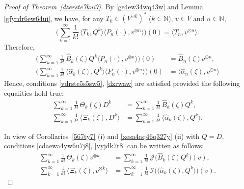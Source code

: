 \documentclass[12pt]{article}
\theoremstyle{remark}
\theoremstyle{remark}
\theoremstyle{remark}
\begin{document}
\begin{proof}[Proof of Theorem~\ref{dzerste7kui7}]
By \eqref{ge4ew34wq43w} and Lemma \ref{gfyrdr6ew64ui}, we have, for any $T_k\in(V^{\odot k})^*$ ($k\in\mathbb N$), $v\in V$ and $n\in\mathbb N$,
\begin{equation*}
\bigg(\sum_{k=1}^\infty \frac 1{k!}\,\langle T_k, Q^{k}\rangle\langle P_n(\cdot),v^{\otimes n}\rangle\bigg)(0)=\langle T_n,v^{\odot n}\rangle.
\end{equation*}
Therefore,
\begin{align*}
\bigg(\sum_{k=1}^\infty \frac 1{k!}\,\widehat B_{k}(\zeta)Q^{k}\langle P_n(\cdot),v^{\otimes n}\rangle\bigg)(0)&=\widehat B_{n}(\zeta)v^{\odot n},\\
\bigg(\sum_{k=1}^\infty \frac 1{k!}\,\langle  \widehat\alpha_{k}(\zeta), Q^{k}\rangle\langle P_n(\cdot),v^{\otimes n}\rangle\bigg)(0)&=\langle  \widehat\alpha_{n}(\zeta),v^{\odot n}\rangle
\end{align*}
Hence, conditions \eqref{vdrste5s5sw5}, \eqref{dzrwaw} are satisfied provided the following equalities hold true:
\begin{align}
\sum_{k=1}^\infty \frac 1{k!}\,  \Theta_k(\zeta) D^{k} &=\sum_{k=1}^\infty \frac 1{k!}\,\widehat B_{k}(\zeta) Q^{k}\label{cdaewa4yw6u7j8},\\
\sum_{k=1}^\infty \frac 1{k!}\,  \langle \Xi_k(\zeta), D^{k}\rangle &=\sum_{k=1}^\infty \frac 1{k!}\,\langle \widehat \alpha_{k}(\zeta), Q^{k}\rangle.
\label{vyjdk7r8}\end{align}

In view of Corollaries~\ref{567ty7} (i) and \ref{xesa4aq46q327y} (ii) with $Q=D$, conditions \eqref{cdaewa4yw6u7j8}, \eqref{vyjdk7r8} can be written as follows:
\begin{align}
\sum_{k=1}^\infty \frac 1{k!}\,  \Theta_k(\zeta) v^{\otimes k}&=\sum_{k=1}^\infty \frac 1{k!}\,\mathcal J\big(\widehat B_{k}(\zeta) Q^{k}\big)(v),\label{vcyd6i5}\\
\sum_{k=1}^\infty \frac 1{k!}\, \langle \Xi_k(\zeta), v^{\otimes k}\rangle&=\sum_{k=1}^\infty \frac 1{k!}\,\mathcal I\big(\langle \widehat \alpha_{k}(\zeta), Q^{k}\rangle\big)(v).\label{dsthe}
\end{align}


\end{proof}
\end{document}
